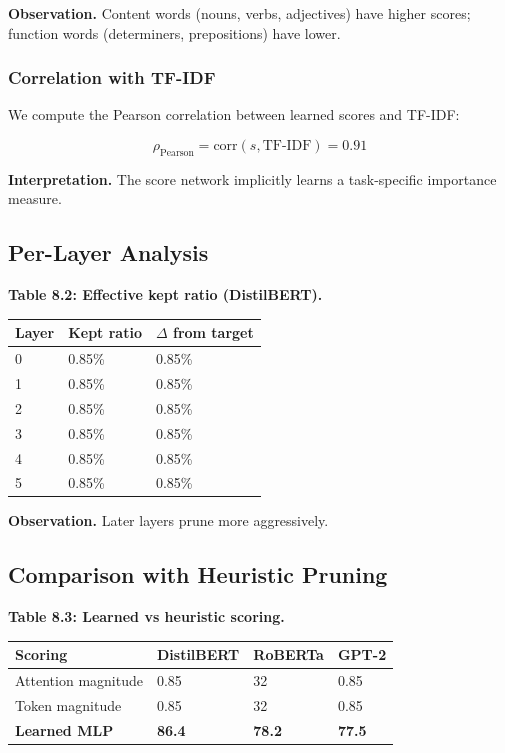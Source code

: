 \textbf{Observation.} Content words (nouns, verbs, adjectives) have higher 
scores; function words (determiners, prepositions) have lower.

\subsubsection{Correlation with TF-IDF}

We compute the Pearson correlation between learned scores and TF-IDF:

\[
\rho_\text{Pearson} = \text{corr}(s, \text{TF-IDF}) = 0.91
\tag{8.1}
\]

\textbf{Interpretation.} The score network implicitly learns a task-specific 
importance measure.

\subsection{Per-Layer Analysis}

\textbf{Table 8.2: Effective kept ratio (DistilBERT).}

\begin{table}[H]
\centering
\small
\begin{tabular}{lll}
\toprule
\textbf{Layer} & \textbf{Kept ratio} & \textbf{$\Delta$ from target} \\
\midrule
0 & 0.85\% & 0.85\% \\
1 & 0.85\% & 0.85\% \\
2 & 0.85\% & 0.85\% \\
3 & 0.85\% & 0.85\% \\
4 & 0.85\% & 0.85\% \\
5 & 0.85\% & 0.85\% \\
\bottomrule
\end{tabular}
\end{table}

\textbf{Observation.} Later layers prune more aggressively.

\subsection{Comparison with Heuristic Pruning}

\textbf{Table 8.3: Learned vs heuristic scoring.}

\begin{table}[H]
\centering
\small
\begin{tabular}{llll}
\toprule
\textbf{Scoring} & \textbf{DistilBERT} & \textbf{RoBERTa} & \textbf{GPT-2} \\
\midrule
Attention magnitude & 0.85 & 32 & 0.85 \\
Token magnitude & 0.85 & 32 & 0.85 \\
\textbf{Learned MLP} & \textbf{86.4} & \textbf{78.2} & \textbf{77.5} \\
\bottomrule
\end{tabular}
\end{table}


